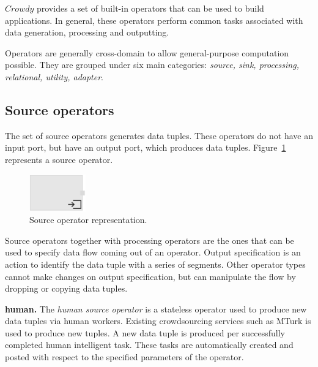 $Crowdy$ provides a set of built-in operators that can be used to build applications. 
In general, these operators perform common tasks associated with data generation, 
processing and outputting.

Operators are generally cross-domain to allow general-purpose 
computation possible. They are grouped under six main categories: 
\textit{source, sink, processing, relational, utility, adapter}.

\subsection{Source operators}
The set of source operators generates data tuples. These operators do not have 
an input port, but have an output port, which produces data tuples. Figure~\ref{fig:source operator} 
represents a source operator.

\begin{figure}[ht]
	\centering
	\includegraphics[height=60px]{figures/SourceOperator.pdf}
	\caption{Source operator representation.}
	\label{fig:source operator}
\end{figure}

Source operators together with processing operators are the ones that can be 
used to specify data flow coming out of an operator. Output specification is an 
action to identify the data tuple with a series of segments. Other operator types 
cannot make changes on output specification, but can manipulate the flow by dropping 
or copying data tuples.

\textbf{human.} 
The \textit{human source operator} is a stateless operator used to produce new data tuples 
via human workers. Existing crowdsourcing services such as MTurk is used 
to produce new tuples. A new data tuple is produced per successfully completed 
human intelligent task. These tasks are automatically created and posted with 
respect to the specified parameters of the operator.


